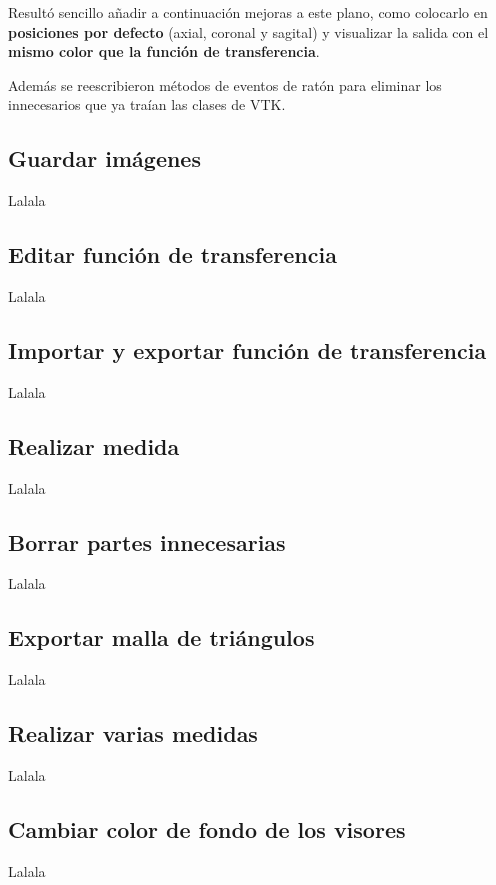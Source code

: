 Resultó sencillo añadir a continuación mejoras a este plano, como colocarlo en \textbf{posiciones por defecto} (axial, coronal y sagital) y visualizar la salida con el \textbf{mismo color que la función de transferencia}.

Además se reescribieron métodos de eventos de ratón para eliminar los innecesarios que ya traían las clases de VTK.

\subsection{Guardar imágenes}

Lalala

\subsection{Editar función de transferencia}

Lalala

\subsection{Importar y exportar función de transferencia}

Lalala

\subsection{Realizar medida}

Lalala

\subsection{Borrar partes innecesarias}

Lalala

\subsection{Exportar malla de triángulos}

Lalala

\subsection{Realizar varias medidas}

Lalala

\subsection{Cambiar color de fondo de los visores}

Lalala